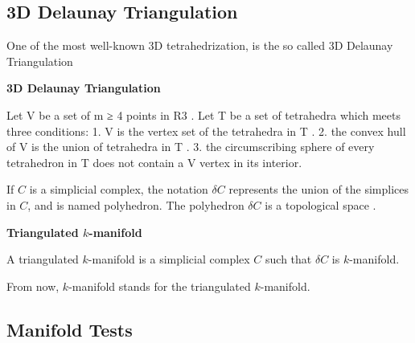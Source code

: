 \subsection{3D Delaunay Triangulation}
One of the most well-known 3D tetrahedrization, is the so called 3D Delaunay Triangulation

\begin{mydef}
 \textbf{3D Delaunay Triangulation}
 
 
\end{mydef}

Let V be a set of m ≥ 4 points in R3 . Let T be a set of
tetrahedra which meets three conditions:
1. V is the vertex set of the tetrahedra in T .
2. the convex hull of V is the union of tetrahedra in T .
3. the circumscribing sphere of every tetrahedron in T does
not contain a V vertex in its interior.








If $C$ is a simplicial complex, the notation $\delta C$ represents the union of the simplices in $C$, and is named polyhedron. The polyhedron $\delta C$ is a topological space .

\begin{mydef}
\textbf{Triangulated $k$-manifold}

A triangulated $k$-manifold is a simplicial complex $C$ such that $\delta C$ is $k$-manifold.
\end{mydef}

From now, $k$-manifold stands for the triangulated $k$-manifold.

\subsection{Manifold Tests}



